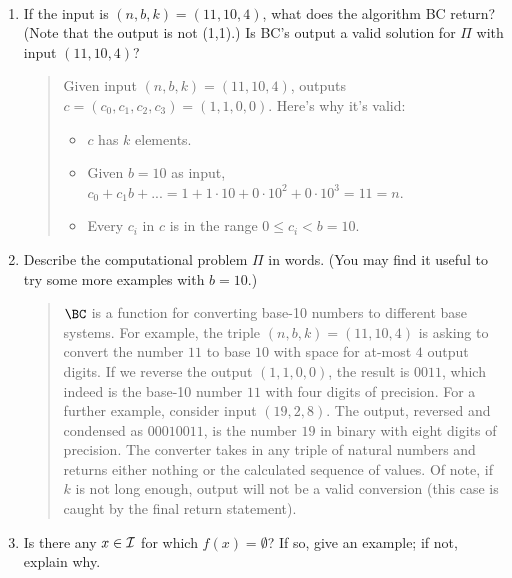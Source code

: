 \documentclass[11pt]{article}
\begin{document}
\begin{enumerate}
    
\begin{algorithm}[H]
    \\
    {
    \lElse{\Return{$\bot$}}}
\end{algorithm}


\begin{enumerate}
\item If the input is $(n,b,k) = (11,10,4)$, what does the algorithm BC return? (Note that the output is not (1,1).) Is BC's output a valid solution for $\Pi$ with input $(11,10,4)$?
    \begin{quote}
        \color{purple}
        Given input $(n, b, k) = (11, 10, 4)$, \BC outputs $c = (c_0, c_1, c_2, c_3) = (1, 1, 0, 0)$.
        Here's why it's valid:
        \begin{itemize}
            \item $c$ has $k$ elements.
            \item Given $b = 10$ as input, $c_0 + c_1b + ... = 1 + 1 \cdot 10 + 0 \cdot 10^2 + 0 \cdot 10^3 = 11 = n$.
            \item Every $c_i$ in $c$ is in the range $0 \leq c_i < b = 10$.
        \end{itemize}
    \end{quote}
\item Describe the computational problem $\Pi$ in words.  (You may find it useful to try some more examples with $b=10$.) 
    \begin{quote}
        \color{purple}
        $\BC$ is a function for converting base-10 numbers to different base systems. For example, the triple $(n, b, k) = (11, 10, 4)$ is asking to convert the number $11$ to base $10$ with space for at-most $4$ output digits. If we reverse the output $(1, 1, 0, 0)$, the result is $0011$, which indeed is the base-10 number $11$ with four digits of precision. For a further example, consider input $(19, 2, 8)$. The output, reversed and condensed as $00010011$, is the number $19$ in binary with eight digits of precision. The converter takes in any triple of natural numbers and returns either nothing or the calculated sequence of values. Of note, if $k$ is not long enough, output will not be a valid conversion (this case is caught by the final return statement).
    \end{quote}
\item Is there any $x\in \mathcal{I}$ for which $f(x)=\emptyset$? If so, give an example; if not, explain why.

\end{enumerate}
\end{enumerate}
\end{document}
